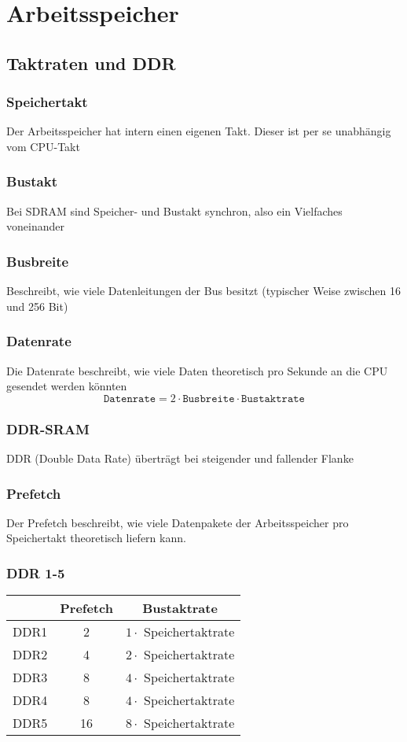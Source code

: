 \section{Arbeitsspeicher}
	\subsection{Taktraten und DDR}
		\subsubsection{Speichertakt}
			Der Arbeitsspeicher hat intern einen eigenen Takt. Dieser ist per se unabhängig vom CPU-Takt
		\subsubsection{Bustakt}
			Bei SDRAM sind Speicher- und Bustakt synchron, also ein Vielfaches voneinander 
		\subsubsection{Busbreite}
			Beschreibt, wie viele Datenleitungen der Bus besitzt (typischer Weise zwischen 16 und 256 Bit)
		\subsubsection{Datenrate}
			Die Datenrate beschreibt, wie viele Daten theoretisch pro Sekunde an die CPU gesendet werden könnten
			$$
				\texttt{Datenrate}=2 \cdot \texttt{Busbreite} \cdot \texttt{Bustaktrate}
			$$
		\subsubsection{DDR-SRAM}
			DDR (Double Data Rate) überträgt bei steigender und fallender Flanke
		\subsubsection{Prefetch}
			Der Prefetch beschreibt, wie viele Datenpakete der Arbeitsspeicher pro Speichertakt theoretisch liefern kann.
		\subsubsection{DDR 1-5}
			\begin{center}
				\begin{tabular}{|c|c|c|}
					\hline
					& Prefetch & Bustaktrate \\
					\hline
					DDR1 & 2 & $1\cdot$ Speichertaktrate \\
					\hline
					DDR2 & 4 & $2\cdot$ Speichertaktrate \\
					\hline
					DDR3 & 8 & $4\cdot$ Speichertaktrate \\
					\hline
					DDR4 & 8 & $4\cdot$ Speichertaktrate \\
					\hline
					DDR5 & 16 & $8\cdot$ Speichertaktrate \\
					\hline
				\end{tabular}
			\end{center}
